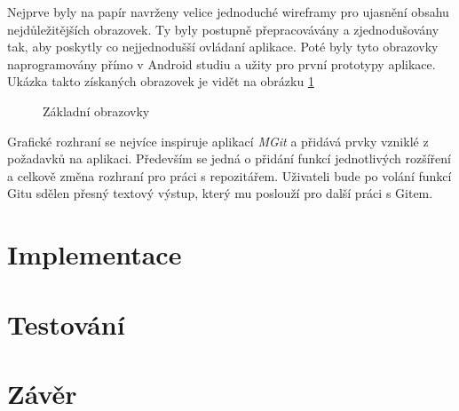     Nejprve byly na papír navrženy velice jednoduché wireframy pro ujasnění obsahu nejdůležitějších obrazovek. Ty byly postupně přepracovávány a zjednodušovány tak, aby poskytly co nejjednodušší ovládaní aplikace. Poté byly tyto obrazovky naprogramovány přímo v Android studiu a užity pro první prototypy aplikace. Ukázka takto získaných obrazovek je vidět na obrázku \ref{fig:obrazovky}

    \begin{figure}[htp]%
        \centering
        \qquad
        \caption{Základní obrazovky}%
        \label{fig:obrazovky}%
    \end{figure}

    Grafické rozhraní se nejvíce inspiruje aplikací \emph{MGit} a přidává prvky vzniklé z požadavků na aplikaci. Především se jedná o přidání funkcí jednotlivých rozšíření a celkově změna rozhraní pro práci s repozitářem. Uživateli bude po volání funkcí Gitu sdělen přesný textový výstup, který mu poslouží pro další práci s Gitem. 
    
\chapter{Implementace}

\chapter{Testování}
\chapter{Závěr}